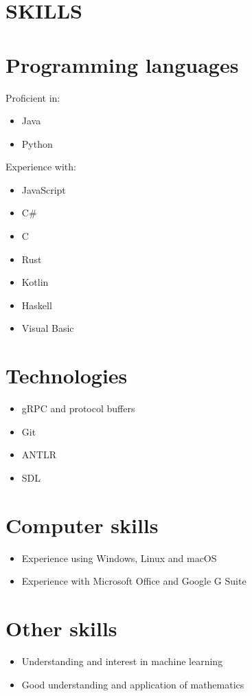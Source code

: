 \documentclass[margin]{res}
\begin{document}
\begin{resume}
\section{SKILLS}

\normalsize{\section{Programming languages}}
Proficient in:
\begin{itemize}
\item Java
\item Python
\end{itemize}

\begin{samepage}
Experience with:
\begin{itemize}
\item JavaScript
\item C\#
\item C
\item Rust
\item Kotlin
\item Haskell
\item Visual Basic
\end{itemize}
\end{samepage}

\normalsize{\section{Technologies}}
\begin{itemize}
\item gRPC and protocol buffers
\item Git
\item ANTLR
\item SDL
\end{itemize}

\normalsize{\section{Computer skills}}
\begin{itemize}
\item Experience using Windows, Linux and macOS
\item Experience with Microsoft Office and Google G Suite
\end{itemize}

\normalsize{\section{Other skills}}
\begin{itemize}
\item Understanding and interest in machine learning
\item Good understanding and application of mathematics
\end{itemize}


\end{resume}
\end{document}
